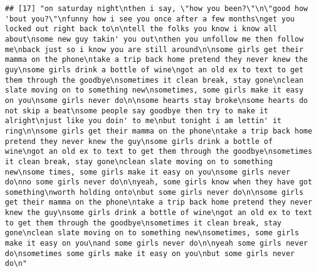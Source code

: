 \documentclass[]{article}
\begin{document}
\begin{verbatim}
## [17] "on saturday night\nthen i say, \"how you been?\"\n\"good how 'bout you?\"\nfunny how i see you once after a few months\nget you locked out right back to\n\ntell the folks you know i know all about\nsome new guy takin' you out\nthen you unfollow me then follow me\nback just so i know you are still around\n\nsome girls get their mamma on the phone\ntake a trip back home pretend they never knew the guy\nsome girls drink a bottle of wine\ngot an old ex to text to get them through the goodbye\nsometimes it clean break, stay gone\nclean slate moving on to something new\nsometimes, some girls make it easy on you\nsome girls never do\n\nsome hearts stay broke\nsome hearts do not skip a beat\nsome people say goodbye then try to make it alright\njust like you doin' to me\nbut tonight i am lettin' it ring\n\nsome girls get their mamma on the phone\ntake a trip back home pretend they never knew the guy\nsome girls drink a bottle of wine\ngot an old ex to text to get them through the goodbye\nsometimes it clean break, stay gone\nclean slate moving on to something new\nsome times, some girls make it easy on you\nsome girls never do\nno some girls never do\n\nyeah, some girls know when they have got something\nworth holding onto\nbut some girls never do\n\nsome girls get their mamma on the phone\ntake a trip back home pretend they never knew the guy\nsome girls drink a bottle of wine\ngot an old ex to text to get them through the goodbye\nsometimes it clean break, stay gone\nclean slate moving on to something new\nsometimes, some girls make it easy on you\nand some girls never do\n\nyeah some girls never do\nsometimes some girls make it easy on you\nbut some girls never do\n"                                                                                                                                                                                                                                                                                                                                                                                                                                                                                                                                                                                                                                                                                                                                                                                                                                                                                                                                                                                                                                                                                                                                                                                                                         

\end{verbatim}
\end{document}
